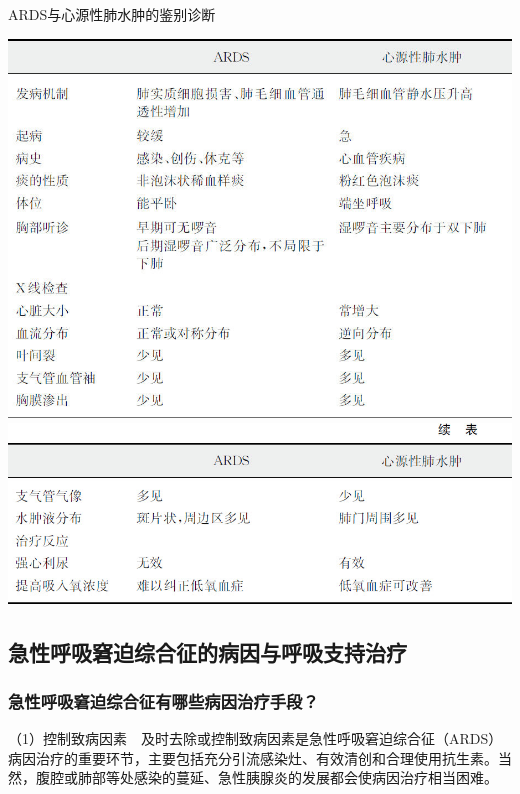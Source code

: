 \begin{table}[htbp]
\centering
\caption{ARDS与心源性肺水肿的鉴别诊断}
\label{tab5-3}
\includegraphics{./images/Image00048.jpg}
\includegraphics{./images/Image00049.jpg}
\end{table}



\subsection{急性呼吸窘迫综合征的病因与呼吸支持治疗}

\subsubsection{急性呼吸窘迫综合征有哪些病因治疗手段？}

（1）控制致病因素　及时去除或控制致病因素是急性呼吸窘迫综合征（ARDS）病因治疗的重要环节，主要包括充分引流感染灶、有效清创和合理使用抗生素。当然，腹腔或肺部等处感染的蔓延、急性胰腺炎的发展都会使病因治疗相当困难。

